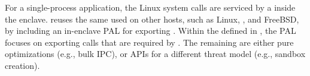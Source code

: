 


\label{sec:sgx:shield:abi}






For a single-process application,
the Linux system calls are serviced by a \libos{}
inside the enclave.
\graphenesgx{} reuses the same \libos{} used on other hosts, such as Linux, \win{}, and FreeBSD,
by including an in-enclave \sgx{} PAL for exporting \thehostabi{}.
Within the \palcallnum{} \hostapis{}
defined in \thehostabi{},
the \sgx{} PAL focuses on exporting \sgxpalcallnum{} calls
that are required by \thelibos{}.
The remaining \hostapis{} are
either pure optimizations (e.g., bulk IPC), or APIs for a different threat model (e.g., sandbox creation).







